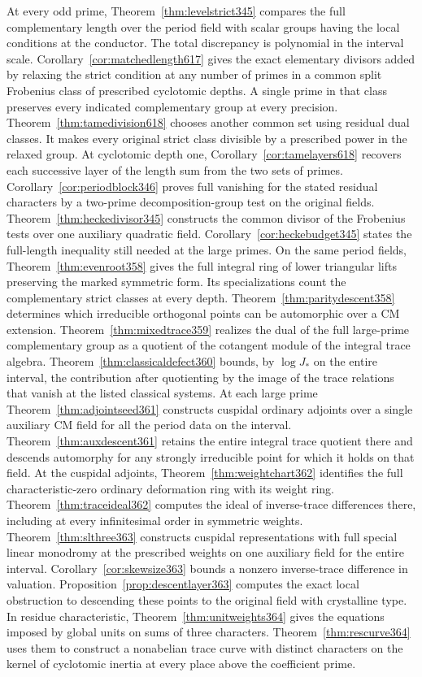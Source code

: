 \documentclass[a4paper,11pt]{article}
\theoremstyle{definition}
\theoremstyle{remark}
\numberwithin{equation}{section}
\begin{document}
At every odd prime, Theorem~\ref{thm:levelstrict345} compares the full complementary length over the period field with scalar groups having the local conditions at the conductor. The total discrepancy is polynomial in the interval scale. Corollary~\ref{cor:matchedlength617} gives the exact elementary divisors added by relaxing the strict condition at any number of primes in a common split Frobenius class of prescribed cyclotomic depths. A single prime in that class preserves every indicated complementary group at every precision. Theorem~\ref{thm:tamedivision618} chooses another common set using residual dual classes. It makes every original strict class divisible by a prescribed power in the relaxed group. At cyclotomic depth one, Corollary~\ref{cor:tamelayers618} recovers each successive layer of the length sum from the two sets of primes. Corollary~\ref{cor:periodblock346} proves full vanishing for the stated residual characters by a two-prime decomposition-group test on the original fields. Theorem~\ref{thm:heckedivisor345} constructs the common divisor of the Frobenius tests over one auxiliary quadratic field. Corollary~\ref{cor:heckebudget345} states the full-length inequality still needed at the large primes. On the same period fields, Theorem~\ref{thm:evenroot358} gives the full integral ring of lower triangular lifts preserving the marked symmetric form. Its specializations count the complementary strict classes at every depth. Theorem~\ref{thm:paritydescent358} determines which irreducible orthogonal points can be automorphic over a CM extension. Theorem~\ref{thm:mixedtrace359} realizes the dual of the full large-prime complementary group as a quotient of the cotangent module of the integral trace algebra. Theorem~\ref{thm:classicaldefect360} bounds, by \(\log J_*\) on the entire interval, the contribution after quotienting by the image of the trace relations that vanish at the listed classical systems. At each large prime Theorem~\ref{thm:adjointseed361} constructs cuspidal ordinary adjoints over a single auxiliary CM field for all the period data on the interval. Theorem~\ref{thm:auxdescent361} retains the entire integral trace quotient there and descends automorphy for any strongly irreducible point for which it holds on that field. At the cuspidal adjoints, Theorem~\ref{thm:weightchart362} identifies the full characteristic-zero ordinary deformation ring with its weight ring. Theorem~\ref{thm:traceideal362} computes the ideal of inverse-trace differences there, including at every infinitesimal order in symmetric weights. Theorem~\ref{thm:slthree363} constructs cuspidal representations with full special linear monodromy at the prescribed weights on one auxiliary field for the entire interval. Corollary~\ref{cor:skewsize363} bounds a nonzero inverse-trace difference in valuation. Proposition~\ref{prop:descentlayer363} computes the exact local obstruction to descending these points to the original field with crystalline type. In residue characteristic, Theorem~\ref{thm:unitweights364} gives the equations imposed by global units on sums of three characters. Theorem~\ref{thm:rescurve364} uses them to construct a nonabelian trace curve with distinct characters on the kernel of cyclotomic inertia at every place above the coefficient prime. 
\end{document}
